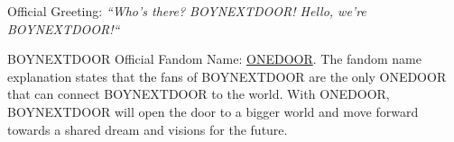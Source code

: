 Official Greeting: \textit{“Who’s there? BOYNEXTDOOR! Hello, we’re BOYNEXTDOOR!“} \par

BOYNEXTDOOR Official Fandom Name: \underline{ONEDOOR}. The fandom name explanation states that the fans of BOYNEXTDOOR are the only ONEDOOR that can connect BOYNEXTDOOR to the world. With ONEDOOR, BOYNEXTDOOR will open the door to a bigger world and move forward towards a shared dream and visions for the future.


